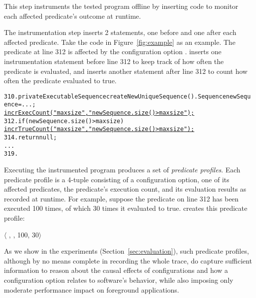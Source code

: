 This step instruments the tested program offline
by inserting code to monitor each affected predicate's outcome
at runtime.

The instrumentation step inserts 2 statements, one
before and one after each affected predicate. Take
the code in Figure~\ref{fig:example} as an example.
The predicate at line 312 is affected by
the configuration option . \ourtool inserts
one instrumentation statement before line 312 to
keep track of how often the predicate is evaluated, and
inserts another statement after line 312 to count how often
the predicate evaluated to true.


\begin{CodeOut}
\begin{alltt}
310. private ExecutableSequence createNewUniqueSequence() .   Sequence newSequence = ...; 
       \underline{incrExecCount("maxsize", "newSequence.size() > maxsize");}
312.   if (newSequence.size() > maxsize) \ttlcb
         \underline{incrTrueCount("maxsize", "newSequence.size() > maxsize");}
314.     return null;
      ...
319. \ttrcb
\end{alltt}
\end{CodeOut}


Executing the instrumented program
produces a set of \textit{predicate profiles}.
Each predicate profile is a 4-tuple consisting of a configuration option,
one of its affected predicates, the predicate's execution count, and its evaluation results as recorded at runtime. For example,
suppose the predicate on line 312 has been executed 100 times, of which
30 times it evaluated to true. \ourtool creates this predicate
profile:

$\langle$ , , 100, 30$\rangle$ 

\vspace{1mm}


As we show in the experiments (Section~\ref{sec:evaluation}),
such predicate profiles, although by no means complete in
recording the whole trace, do capture
sufficient information to reason about the causal effects of configurations
and how a configuration option relates to software's behavior, while
also imposing only moderate performance impact
on foreground applications.





